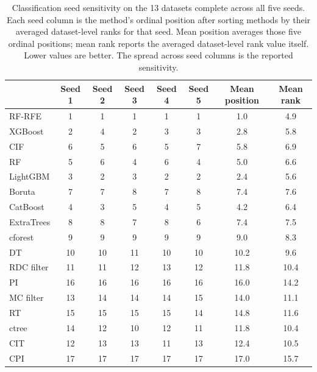 \begin{table}[tb]
  \centering
  \footnotesize
  \setlength{\tabcolsep}{4pt}
  \renewcommand{\arraystretch}{1.04}
  \begin{tabular}{@{}l
    S[table-format=2.0]
    S[table-format=2.0]
    S[table-format=2.0]
    S[table-format=2.0]
    S[table-format=2.0]
    S[table-format=2.1]
    S[table-format=2.1]@{}}
    \toprule
     & {Seed 1} & {Seed 2} & {Seed 3} & {Seed 4} & {Seed 5} & {Mean position} & {Mean rank} \\
    \midrule
    RF-RFE & 1 & 1 & 1 & 1 & 1 & 1.0 & 4.9 \\
    XGBoost & 2 & 4 & 2 & 3 & 3 & 2.8 & 5.8 \\
    CIF & 6 & 5 & 6 & 5 & 7 & 5.8 & 6.9 \\
    RF & 5 & 6 & 4 & 6 & 4 & 5.0 & 6.6 \\
    LightGBM & 3 & 2 & 3 & 2 & 2 & 2.4 & 5.6 \\
    Boruta & 7 & 7 & 8 & 7 & 8 & 7.4 & 7.6 \\
    CatBoost & 4 & 3 & 5 & 4 & 5 & 4.2 & 6.4 \\
    ExtraTrees & 8 & 8 & 7 & 8 & 6 & 7.4 & 7.5 \\
    cforest & 9 & 9 & 9 & 9 & 9 & 9.0 & 8.3 \\
    DT & 10 & 10 & 11 & 10 & 10 & 10.2 & 9.6 \\
    RDC filter & 11 & 11 & 12 & 13 & 12 & 11.8 & 10.4 \\
    PI & 16 & 16 & 16 & 16 & 16 & 16.0 & 14.2 \\
    MC filter & 13 & 14 & 14 & 14 & 15 & 14.0 & 11.1 \\
    RT & 15 & 15 & 15 & 15 & 14 & 14.8 & 11.6 \\
    ctree & 14 & 12 & 10 & 12 & 11 & 11.8 & 10.4 \\
    CIT & 12 & 13 & 13 & 11 & 13 & 12.4 & 10.5 \\
    CPI & 17 & 17 & 17 & 17 & 17 & 17.0 & 15.7 \\
    \bottomrule
  \end{tabular}
  \caption{Classification seed sensitivity on the 13 datasets complete across
  all five seeds. Each seed column is the method's ordinal position after
  sorting methods by their averaged dataset-level ranks for that seed. Mean
  position averages those five ordinal positions; mean rank reports the averaged
  dataset-level rank value itself. Lower values are better. The spread across seed columns is the reported sensitivity.}
  \label{tab:classification-seed-sensitivity}
\end{table}

